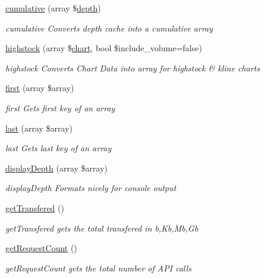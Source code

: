 \begin{DoxyCompactItemize}
\hyperlink{classBinance_1_1API_a00d93784ab9eb83c3817ccaa75e9746d}{cumulative} (array \$\hyperlink{classBinance_1_1API_ac36901dbea220b2401786a6d1bc4d051}{depth})
\begin{DoxyCompactList}\small\item\em cumulative Converts depth cache into a cumulative array \end{DoxyCompactList}\item 
\hyperlink{classBinance_1_1API_a5eaa9d36db8181fc4605a3841f1106ac}{highstock} (array \$\hyperlink{classBinance_1_1API_a2d4a65cde999da48f82c29e989133ac3}{chart}, bool \$include\-\_\-volume=false)
\begin{DoxyCompactList}\small\item\em highstock Converts Chart Data into array for highstock \& kline charts \end{DoxyCompactList}\item 
\hyperlink{classBinance_1_1API_a53fcf31d85faa8445653f581fdbdb72c}{first} (array \$array)
\begin{DoxyCompactList}\small\item\em first Gets first key of an array \end{DoxyCompactList}\item 
\hyperlink{classBinance_1_1API_a468092e1edfd35f79954236714c825c6}{last} (array \$array)
\begin{DoxyCompactList}\small\item\em last Gets last key of an array \end{DoxyCompactList}\item 
\hyperlink{classBinance_1_1API_a184430be210c8e5cb7be80c9e239619f}{display\-Depth} (array \$array)
\begin{DoxyCompactList}\small\item\em display\-Depth Formats nicely for console output \end{DoxyCompactList}\item 
\hyperlink{classBinance_1_1API_ae1688d4d245b8f22a87c7afb1db5432a}{get\-Transfered} ()
\begin{DoxyCompactList}\small\item\em get\-Transfered gets the total transfered in b,Kb,Mb,Gb \end{DoxyCompactList}\item 
\hyperlink{classBinance_1_1API_abfb76ae473557ff989bee3287d3c437c}{get\-Request\-Count} ()
\begin{DoxyCompactList}\small\item\em get\-Request\-Count gets the total number of A\-P\-I calls \end{DoxyCompactList}\item 

\end{DoxyCompactItemize}
